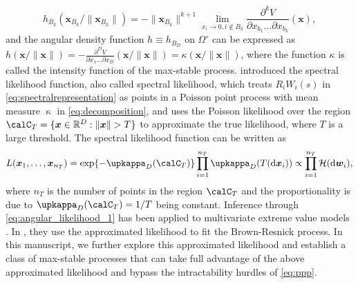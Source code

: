 \documentclass[12pt]{article}
\begin{document}
%
\begin{equation}\label{eq:angular_density}
	h_{B_k}\left(\bm x_{B_k} / \|\bm x_{B_k}\| \right) = -\|\bm x_{B_k}\|^{k+1}\lim_{x_i\to 0, i\notin B_k} \frac{\partial^k V}{\partial x_{b_1}\dots\partial x_{b_k}} (\bm x),
\end{equation}
%
and the angular density function $h \equiv h_{B_D}$ on $\Omega^\circ$ can be expressed as $h(\bm x/\|\bm x\|) = -\frac{\partial^D V}{\partial x_1\dots\partial x_D}(\bm x/\|\bm x\|) = \kappa(\bm x/\|\bm x\|)$, where the function $\kappa$ is called  the intensity function of the max-stable process. \cite{Coles.Tawn:1994} introduced the spectral likelihood function, also called spectral likelihood, which treats $R_iW_i(s)$ in \eqref{eq:spectralrepresentation} as 
points in a Poisson point process with mean measure $\upkappa$ in \eqref{eq:decomposition}, and uses the Poisson likelihood over the region $\calC_{T} = \{\bm x\in\mathbb R^D: \|\bm x\|> T\}$ to approximate the true likelihood, where $T$ is a large threshold. The spectral likelihood function can be written as 
%
\begin{equation}
\label{eq:angular_likelihood_1}
L(\bm x_1,\dots,\bm x_{n_{T}}) = \exp\{-\upkappa_D(\calC_{T})\}\prod_{i=1}^{n_{T}}\upkappa_D(T(\text{d}\bm x_i)) \propto \prod_{i=1}^{n_{T}}\mathcal H(\text{d}\bm w_i),    
\end{equation}
%
where $n_{T}$ is the number of points in the region $\calC_{T}$ and the proportionality is due to $\upkappa_D(\calC_{T})=1/T$ being constant. Inference through \eqref{eq:angular_likelihood_1} has been applied to multivariate extreme value models \citep[e.g.,][]{Cooley.etal:2010, Engelke.etal:2015, Beranger.Padoan:2015}. In \citet{Engelke.etal:2015}, they use the approximated likelihood to fit the Brown-Resnick process. In this manuscript, we further explore this approximated likelihood and establish a class of max-stable processes that can take full advantage of the above approximated likelihood and bypass the intractability hurdles of \eqref{eq:ppp}.
\end{document}
